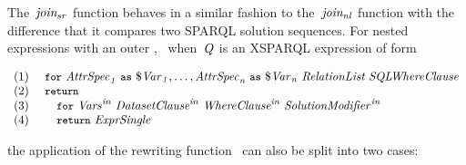 %
\noindent The~$\mathit{join_{sr}}$ function behaves in a similar fashion to the~$\mathit{join_{nl}}$ function with
the difference that it compares two SPARQL solution sequences.
%
For nested expressions with an outer \SQLForClause, \ie~when~$\mathit{{Q}_{}}$ is an XSPARQL expression of form
\begin{queryF}
\[\begin{array}{l}
  \mathrm{(1)~~~~}\texttt{{\small for}}~\mathit{{AttrSpec}_{1}}~\texttt{{\small as}}~\mathit{{\$\mathit{Var}}_{1}}, \dots, \mathit{{AttrSpec}_{n}}~\texttt{{\small as}}~\mathit{{\$\mathit{Var}}_{n}}~{\textit{RelationList}}~{\textit{SQLWhereClause}}\\
  \mathrm{(2)~~~~}\texttt{{\small return}}\\
  \mathrm{(3)~~~~}\quad\texttt{{\small for}}~{\mathit{\mathit{Vars}}}_{\mathit{}}^{\mathit{in}}~{\mathit{{\textit{Da\-ta\-set\-Clau\-se}}}}_{\mathit{}}^{\mathit{in}}~{\mathit{{\textit{Whe\-re\-Clause}}}}_{\mathit{}}^{\mathit{in}}~{\mathit{SolutionModifier}}_{\mathit{}}^{\mathit{in}}\\
  \mathrm{(4)~~~~}\quad\texttt{{\small return}}~{\textit{Expr\-Single}}
\end{array}\]
\label{eq:expr_sdep_sql}
\end{queryF}%
%
\noindent the application of the rewriting function~ can also be split into two cases:
%
